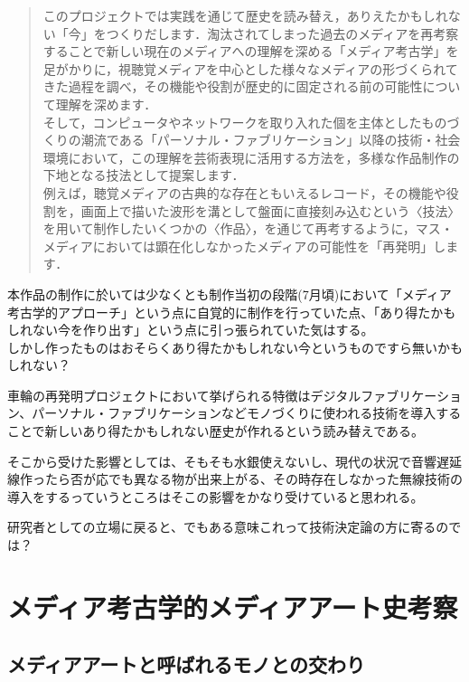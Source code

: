 \begin{quote}
このプロジェクトでは実践を通じて歴史を読み替え，ありえたかもしれない「今」をつくりだします．淘汰されてしまった過去のメディアを再考察することで新しい現在のメディアへの理解を深める「メディア考古学」を足がかりに，視聴覚メディアを中心とした様々なメディアの形づくられてきた過程を調べ，その機能や役割が歴史的に固定される前の可能性について理解を深めます．\\
そして，コンピュータやネットワークを取り入れた個を主体としたものづくりの潮流である「パーソナル・ファブリケーション」以降の技術・社会環境において，この理解を芸術表現に活用する方法を，多様な作品制作の下地となる技法として提案します．\\
例えば，聴覚メディアの古典的な存在ともいえるレコード，その機能や役割を，画面上で描いた波形を溝として盤面に直接刻み込むという〈技法〉を用いて制作したいくつかの〈作品〉，を通じて再考するように，マス・メディアにおいては顕在化しなかったメディアの可能性を「再発明」します．\\
\autocite{iamas:RIWP}
\end{quote}

本作品の制作に於いては少なくとも制作当初の段階(7月頃)において「メディア考古学的アプローチ」という点に自覚的に制作を行っていた点、「あり得たかもしれない今を作り出す」という点に引っ張られていた気はする。\\
しかし作ったものはおそらくあり得たかもしれない今というものですら無いかもしれない？

車輪の再発明プロジェクトにおいて挙げられる特徴はデジタルファブリケーション、パーソナル・ファブリケーションなどモノづくりに使われる技術を導入することで新しいあり得たかもしれない歴史が作れるという読み替えである。

そこから受けた影響としては、そもそも水銀使えないし、現代の状況で音響遅延線作ったら否が応でも異なる物が出来上がる、その時存在しなかった無線技術の導入をするっていうところはそこの影響をかなり受けていると思われる。

研究者としての立場に戻ると、でもある意味これって技術決定論の方に寄るのでは？

\chapter{メディア考古学的メディアアート史考察}\label{ux30e1ux30c7ux30a3ux30a2ux8003ux53e4ux5b66ux7684ux30e1ux30c7ux30a3ux30a2ux30a2ux30fcux30c8ux53f2ux8003ux5bdf}

\section{メディアアートと呼ばれるモノとの交わり}\label{ux30e1ux30c7ux30a3ux30a2ux30a2ux30fcux30c8ux3068ux547cux3070ux308cux308bux30e2ux30ceux3068ux306eux4ea4ux308fux308a}

